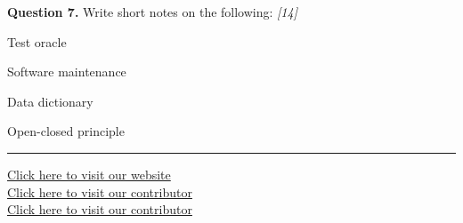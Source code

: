 \documentclass[11pt,a4paper]{article}
\newcommand{\pts}[1]{\hfill   \textit{[#1]}}
\begin{document}
\medskip


\noindent   \textbf{Question 7.} Write short notes on the following: \pts{14}

\begin{parts}
  \item Test oracle
  \item Software maintenance
  \item Data dictionary
  \item Open-closed principle
\end{parts}

\vfill
\rule{\linewidth}{0.4pt}

\begin{center}\small
\href{https://bhu-exam.vercel.app/}{Click here to visit our website}\\[4pt]\href{https://me-aryan.vercel.app/}{Click here to visit our contributor}\\[4pt]\href{https://quashan-me.vercel.app/}{Click here to visit our contributor}
\end{center}
\end{document}
